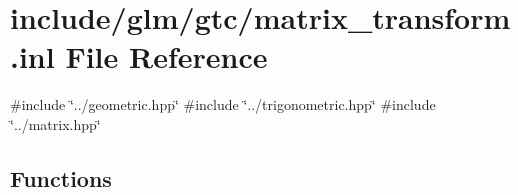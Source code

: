\hypertarget{matrix__transform_8inl}{}\section{include/glm/gtc/matrix\+\_\+transform.inl File Reference}
\label{matrix__transform_8inl}
{\ttfamily \#include \char`\"{}../geometric.\+hpp\char`\"{}}\newline
{\ttfamily \#include \char`\"{}../trigonometric.\+hpp\char`\"{}}\newline
{\ttfamily \#include \char`\"{}../matrix.\+hpp\char`\"{}}\newline
\subsection*{Functions}
